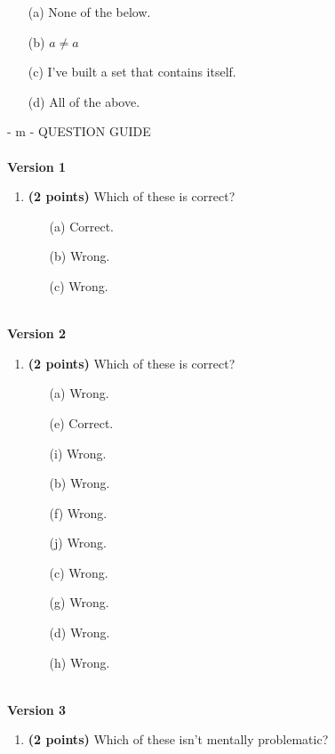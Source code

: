 \documentclass[12pt]{amsart}
\begin{document}
\begin{enumerate}[resume]
\begin{minipage}[t]{1.0\linewidth}\begin{itemize}\item[(a)]  None of the below.  \item[(b)]  $a \neq a$ \item[(c)]  I've built a set that contains itself. \item[(d)]   All of the above. \end{itemize}\end{minipage} \vfill \end{enumerate} - m - QUESTION GUIDE \\$ $ \\ {\bf Version 1} \\\begin{enumerate}[resume]
\item {\bf (2 points)} 
 Which of these is correct?

\begin{minipage}[t]{1.0\linewidth}\begin{multicols}{3}\begin{itemize}\item[(a)]  Correct. \item[(b)]  Wrong. \item[(c)]  Wrong. \end{itemize}\end{multicols}\end{minipage} \vfill \end{enumerate}$ $ \\ {\bf Version 2} \\\begin{enumerate}[resume]
\item {\bf (2 points)} 
 Which of these is correct?

\begin{minipage}[t]{1.0\linewidth}\begin{multicols}{4}\begin{itemize}\item[(a)]  Wrong. \item[(e)]  Correct. \item[(i)]  Wrong. \item[(b)]  Wrong. \item[(f)]  Wrong. \item[(j)]  Wrong. \item[(c)]  Wrong. \item[(g)]  Wrong. \item[] \item[(d)]  Wrong. \item[(h)]  Wrong. \item[] \end{itemize}\end{multicols}\end{minipage} \vfill \end{enumerate}$ $ \\ {\bf Version 3} \\\begin{enumerate}[resume]
\item {\bf (2 points)} 
 Which of these isn't mentally problematic?


\end{enumerate}
\end{document}
